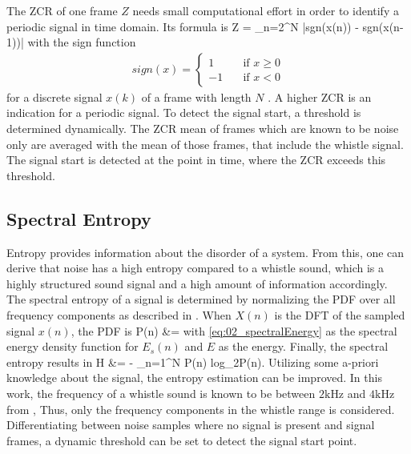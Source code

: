 The \ac{ZCR} of one frame $Z$ needs small computational effort in order to
identify a periodic signal in time domain.
Its formula is
\bal
    Z = \sum_{n=2}^N |sgn(x(n)) - sgn(x(n-1))|
    \label{eq:02_zcr}
\eal
with the sign function
\begin{align*}
    sign(x) =
    \begin{cases}
        1 & \quad \text{if } x\geq 0 \\
        -1 & \quad \text{if } x < 0
    \end{cases}
\end{align*}
for a discrete signal $x(k)$ of a frame with length $N$ \cite{Z_W_voiceActivity}.
A higher \ac{ZCR} is an indication for a periodic signal.
To detect the signal start, a threshold is determined dynamically.
The \ac{ZCR} mean of frames which are known to be noise only
are averaged with the mean of those frames, that include the whistle signal.
The signal start is detected at the point in time, where the \ac{ZCR} exceeds
this threshold.

\subsection{Spectral Entropy}
\label{subsec:02_Entropy}

Entropy provides information about the disorder of a system.
From this, one can derive that noise has a high entropy compared to
a whistle sound, which is a highly structured sound signal and a high
amount of information accordingly.
The spectral entropy of a signal is determined by normalizing the
\ac{PDF} over all frequency components as described in \cite{S_J_entropy}.
When $X(n)$ is the \ac{DFT} of the sampled signal $x(n)$, the \ac{PDF} is
\bal
    P(n) &= 
    \label{eq:02_pdf}
\eal
with \cref{eq:02_spectralEnergy} as the spectral energy density function for $E_s(n)$
and $E$ as the energy.
Finally, the spectral entropy results in
\bal
    H &= - \sum_{n=1}^N P(n) log_2P(n).
    \label{eq:02_entropy}
\eal
Utilizing some a-priori knowledge about the signal, the entropy estimation
can be improved.
In this work, the frequency of a whistle sound is known to be
between $2\si{\kilo\hertz}$ and $4\si{\kilo\hertz}$ from \cite{Hasselbring},
Thus, only the frequency components in the whistle range is considered.
Differentiating between noise samples where no signal is present and
signal frames, a dynamic threshold can be set to detect the signal start point.